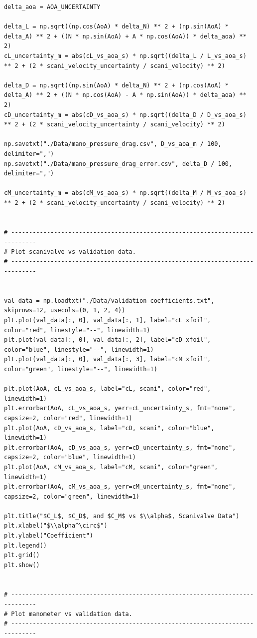 \documentclass[runningheads]{llncs}
\begin{document}
\begin{verbatim}
delta_aoa = AOA_UNCERTAINTY

delta_L = np.sqrt((np.cos(AoA) * delta_N) ** 2 + (np.sin(AoA) * delta_A) ** 2 + ((N * np.sin(AoA) + A * np.cos(AoA)) * delta_aoa) ** 2)
cL_uncertainty_m = abs(cL_vs_aoa_s) * np.sqrt((delta_L / L_vs_aoa_s) ** 2 + (2 * scani_velocity_uncertainty / scani_velocity) ** 2)

delta_D = np.sqrt((np.sin(AoA) * delta_N) ** 2 + (np.cos(AoA) * delta_A) ** 2 + ((N * np.cos(AoA) - A * np.sin(AoA)) * delta_aoa) ** 2)
cD_uncertainty_m = abs(cD_vs_aoa_s) * np.sqrt((delta_D / D_vs_aoa_s) ** 2 + (2 * scani_velocity_uncertainty / scani_velocity) ** 2)

np.savetxt("./Data/mano_pressure_drag.csv", D_vs_aoa_m / 100, delimiter=",")
np.savetxt("./Data/mano_pressure_drag_error.csv", delta_D / 100, delimiter=",")

cM_uncertainty_m = abs(cM_vs_aoa_s) * np.sqrt((delta_M / M_vs_aoa_s) ** 2 + (2 * scani_velocity_uncertainty / scani_velocity) ** 2)


# -----------------------------------------------------------------------------
# Plot scanivalve vs validation data.
# -----------------------------------------------------------------------------


val_data = np.loadtxt("./Data/validation_coefficients.txt", skiprows=12, usecols=(0, 1, 2, 4))
plt.plot(val_data[:, 0], val_data[:, 1], label="cL xfoil", color="red", linestyle="--", linewidth=1)
plt.plot(val_data[:, 0], val_data[:, 2], label="cD xfoil", color="blue", linestyle="--", linewidth=1)
plt.plot(val_data[:, 0], val_data[:, 3], label="cM xfoil", color="green", linestyle="--", linewidth=1)

plt.plot(AoA, cL_vs_aoa_s, label="cL, scani", color="red", linewidth=1)
plt.errorbar(AoA, cL_vs_aoa_s, yerr=cL_uncertainty_s, fmt="none", capsize=2, color="red", linewidth=1)
plt.plot(AoA, cD_vs_aoa_s, label="cD, scani", color="blue", linewidth=1)
plt.errorbar(AoA, cD_vs_aoa_s, yerr=cD_uncertainty_s, fmt="none", capsize=2, color="blue", linewidth=1)
plt.plot(AoA, cM_vs_aoa_s, label="cM, scani", color="green", linewidth=1)
plt.errorbar(AoA, cM_vs_aoa_s, yerr=cM_uncertainty_s, fmt="none", capsize=2, color="green", linewidth=1)

plt.title("$C_L$, $C_D$, and $C_M$ vs $\\alpha$, Scanivalve Data")
plt.xlabel("$\\alpha^\circ$")
plt.ylabel("Coefficient")
plt.legend()
plt.grid()
plt.show()


# -----------------------------------------------------------------------------
# Plot manometer vs validation data.
# -----------------------------------------------------------------------------



\end{verbatim}
\end{document}
